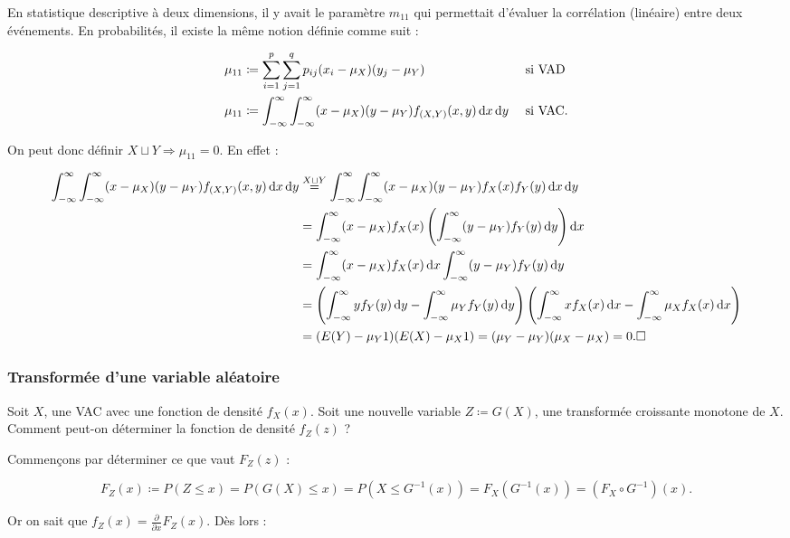 \documentclass{article}
\renewcommand{\pd}[1]{\frac {\partial}{\partial #1}}
\begin{document}
			En statistique descriptive à deux dimensions, il y avait le paramètre $m_{11}$ qui permettait d'évaluer la corrélation (linéaire) entre deux événements.
			En probabilités, il existe la même notion définie comme suit :

			\begin{align}
				\mu_{11} &\coloneqq \sum_{i=1}^p\sum_{j=1}^qp_{ij}(x_i-\mu_X)(y_j-\mu_Y) \;\;\;\;&&\text{ si VAD}\\
				\mu_{11} &\coloneqq \int_{-\infty}^\infty\int_{-\infty}^\infty(x-\mu_X)(y-\mu_Y)f_{(X, Y)}(x, y)\dif x\dif y &&\text{ si VAC}.
			\end{align}

			On peut donc définir $X \sqcup Y \Rightarrow \mu_{11} = 0$. En effet :

			\[\begin{aligned}
				\int_{-\infty}^\infty\int_{-\infty}^\infty(x-\mu_X)(y-\mu_Y)f_{(X, Y)}(x, y)\dif x\dif y &\stackrel{X \sqcup Y}{=}
					\int_{-\infty}^\infty\int_{-\infty}^\infty(x-\mu_X)(y-\mu_Y)f_X(x)f_Y(y)\dif x\dif y \\
				&= \int_{-\infty}^\infty(x-\mu_X)f_X(x)\left(\int_{-\infty}^\infty(y-\mu_Y)f_Y(y)\dif y\right)\dif x \\
				&= \int_{-\infty}^\infty(x-\mu_X)f_X(x)\dif x\int_{-\infty}^\infty(y-\mu_Y)f_Y(y)\dif y \\
				&= \left(\int_{-\infty}^\infty y f_Y(y)\dif y - \int_{-\infty}^\infty\mu_Yf_Y(y)\dif y\right)\left(\int_{-\infty}^\infty x f_X(x)\dif x - \int_{-\infty}^\infty\mu_Xf_X(x)\dif x\right) \\
				&= (E(Y) - \mu_Y1)(E(X) - \mu_X1) = (\mu_Y - \mu_Y)(\mu_X - \mu_X) = 0. \square
			\end{aligned}\]

		\subsubsection{Transformée d'une variable aléatoire}
			Soit $X$, une VAC avec une fonction de densité $f_X(x)$. Soit une nouvelle variable $Z \coloneqq G(X)$, une transformée croissante monotone de $X$. Comment peut-on
			déterminer la fonction de densité $f_Z(z)$ ?

			Commençons par déterminer ce que vaut $F_Z(z)$ :

			\[F_Z(x) \coloneqq P(Z \leq x) = P(G(X) \leq x) = P(X \leq G^{-1}(x)) = F_X(G^{-1}(x)) = (F_X \circ G^{-1})(x).\]

			Or on sait que $f_Z(x) = \pd xF_Z(x)$. Dès lors :
\end{document}
